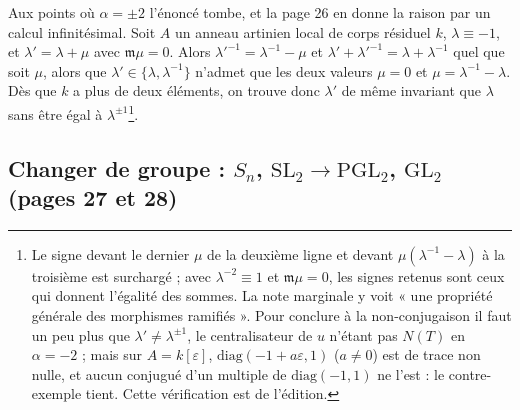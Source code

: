 \documentclass[11pt,a4paper]{article}
\begin{document}
Aux points où $\alpha = \pm 2$ l'énoncé tombe, et la page 26 en donne la raison
par un calcul infinitésimal. Soit $A$ un anneau artinien local de corps
résiduel $k$, $\lambda \equiv -1$, et $\lambda' = \lambda + \mu$ avec
$\mathfrak{m}\mu = 0$. Alors $\lambda'^{-1} = \lambda^{-1} - \mu$ et
$\lambda' + \lambda'^{-1} = \lambda + \lambda^{-1}$ quel que soit $\mu$, alors
que $\lambda' \in \{\lambda, \lambda^{-1}\}$ n'admet que les deux valeurs
$\mu = 0$ et $\mu = \lambda^{-1} - \lambda$. Dès que $k$ a plus de deux
éléments, on trouve donc $\lambda'$ de même invariant que $\lambda$ sans être
égal à $\lambda^{\pm 1}$\footnote{Le signe devant le dernier $\mu$ de la
deuxième ligne et devant $\mu(\lambda^{-1} - \lambda)$ à la troisième est
surchargé ; avec $\lambda^{-2} \equiv 1$ et $\mathfrak{m}\mu = 0$, les signes
retenus sont ceux qui donnent l'égalité des sommes. La note marginale y voit
« une propriété générale des morphismes ramifiés ». Pour conclure à la
non-conjugaison il faut un peu plus que $\lambda' \neq \lambda^{\pm1}$, le
centralisateur de $u$ n'étant pas $N(T)$ en $\alpha = -2$ ; mais sur $A =
k[\varepsilon]$, $\mathrm{diag}(-1 + a\varepsilon, 1)$ ($a \neq 0$) est de trace
non nulle, et aucun conjugué d'un multiple de $\mathrm{diag}(-1, 1)$ ne l'est :
le contre-exemple tient. Cette vérification est de l'édition.}.

\subsection*{Changer de groupe : $S_n$, $\mathrm{SL}_2 \to \mathrm{PGL}_2$, $\mathrm{GL}_2$ (pages 27 et 28)}
\end{document}
